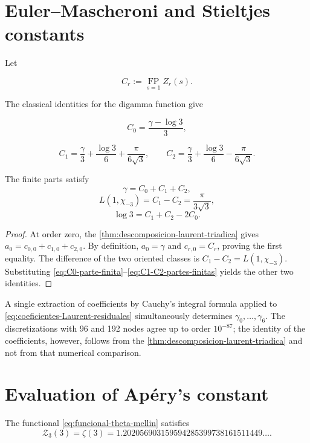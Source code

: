 \section{Euler--Mascheroni and Stieltjes constants}

Let

\[
 C_r:=\operatorname*{FP}_{s=1}Z_r(s).
\]

The classical identities for the digamma function give
\cite{Apostol1976,Lagarias2013}

\begin{equation}
 C_0=\frac{\gamma-\log3}{3},
 \label{eq:C0-parte-finita}
\end{equation}

\begin{equation}
 C_1=\frac\gamma3+\frac{\log3}{6}+\frac{\pi}{6\sqrt3},
 \qquad
 C_2=\frac\gamma3+\frac{\log3}{6}-\frac{\pi}{6\sqrt3}.
 \label{eq:C1-C2-partes-finitas}
\end{equation}

\begin{corollary}
\label{cor:gamma-log3-L1}
The finite parts satisfy
\[
 \boxed{\gamma=C_0+C_1+C_2},
\]
\[
 \boxed{L(1,\chi_{-3})=C_1-C_2=\frac{\pi}{3\sqrt3}},
\]
\[
 \boxed{\log3=C_1+C_2-2C_0}.
\]
\end{corollary}

\begin{proof}
At order zero, the \cref{thm:descomposicion-laurent-triadica} gives
$a_0=c_{0,0}+c_{1,0}+c_{2,0}$. By definition,
$a_0=\gamma$ and $c_{r,0}=C_r$, proving the first equality. The
difference of the two oriented classes is
$C_1-C_2=L(1,\chi_{-3})$. Substituting
\eqref{eq:C0-parte-finita}--\eqref{eq:C1-C2-partes-finitas} yields the
other two identities.
\end{proof}

A single extraction of coefficients by Cauchy's integral
formula applied to \eqref{eq:coeficientes-Laurent-residuales} simultaneously determines
$\gamma_0,\ldots,\gamma_6$. The discretizations with 96 and
192 nodes agree up to order $10^{-87}$; the identity of the
coefficients, however, follows from the
\cref{thm:descomposicion-laurent-triadica} and not from that numerical comparison.

\section{Evaluation of Apéry's constant}

\begin{proposition}
\label{prop:evaluacion-apery}
The functional \eqref{eq:funcional-theta-mellin} satisfies
\[
 \boxed{
 \mathcal Z_3(3)=\zeta(3)
 =1.202056903159594285399738161511449\ldots}.
\]
\end{proposition}

